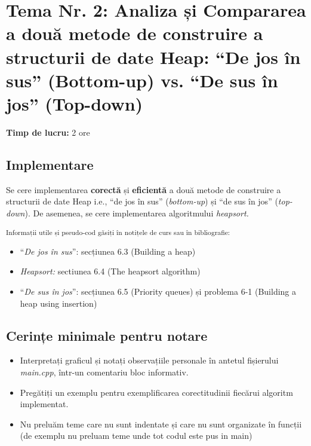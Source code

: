 \documentclass[../ro-fa-lab.tex]{subfiles}
\begin{document}
\section{\texorpdfstring{\textbf{Tema Nr. 2: Analiza și Compararea a două metode de construire a
structurii de date Heap: ``De jos în sus'' (Bottom-up) vs. ``De sus în
jos'' (Top-down)}}{Tema Nr. 2: Analiza și Compararea a două metode de construire a
structurii de date Heap: ``De jos în sus'' (Bottom-up) vs. ``De sus în
jos'' (Top-down)}}\label{assign2}

\textbf{Timp de lucru:} 2 ore

\subsection{Implementare}\label{implementare}

Se cere implementarea \textbf{corectă} și \textbf{eficientă} a două
metode de construire a structurii de date Heap i.e., ``de jos în sus''
(\emph{bottom-up}) și ``de sus în jos'' (\emph{top-down}). De asemenea,
se cere implementarea algoritmului \emph{heapsort.}

\textsubscript{Informații utile și pseudo-cod găsiți în notițele de curs
sau în bibliografie}\citep{cormen}\textsubscript{:}

\begin{itemize}
\item
  ``\emph{De jos în sus}'': secțiunea 6.3
  (Building a heap)
\item
  \emph{Heapsort:} sectiunea 6.4 (The heapsort
  algorithm)
\item
  ``\emph{De sus în jos}'': secțiunea 6.5
  (Priority queues) și problema 6-1 (Building a heap using insertion)
\end{itemize}

\subsection{Cerințe minimale pentru
notare}\label{cerinux21be-minimale-pentru-notare}

\begin{itemize}
\item
  Interpretați graficul și notați observațiile personale în antetul
  fișierului \emph{main.cpp}, într-un comentariu bloc informativ.
\end{itemize}

\begin{itemize}
\item
  Pregătiți un exemplu pentru exemplificarea corectitudinii fiecărui
  algoritm implementat.
\item
  Nu preluăm teme care nu sunt indentate și care nu sunt organizate în
  funcții (de exemplu nu preluam teme unde tot codul este pus in main)
\end{itemize}
\end{document}
